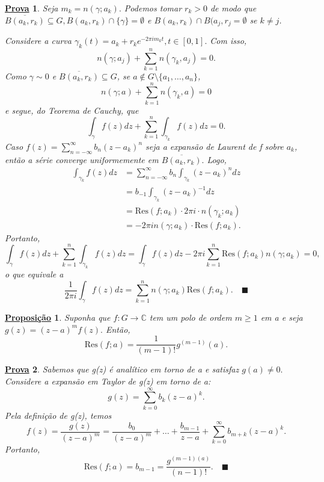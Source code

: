 \documentclass{article}
\newtheorem*{proof*}{\underline{Prova}}
\newtheorem*{prop*}{\underline{Proposi\c c\~ao}}
\renewcommand\qedsymbol{$\blacksquare$}
\begin{document}
 \begin{proof*}
   Seja \(m_{k} = n(\gamma ; a_{k}).\) Podemos tomar \(r_{k}>0\) de modo que \(\overline{B(a_{k}, r_{k})}\subseteq G, B(a_{k}, r_{k})\cap\{\gamma \}=\emptyset \) e 
 \(B(a_{k}, r_{k})\cap B(a_{j}, r_{j} = \emptyset \) se \(k\neq j\).

  Considere a curva \(\gamma_{k}(t) = a_{k} + r_{k}e^{-2\pi i m_{k}t},t\in[0, 1].\) Com isso,
  \[
    n(\gamma ; a_{j}) + \sum\limits_{k=1}^{n}n(\gamma_{k}, a_{j}) = 0.
  \]
  Como \(\gamma \sim 0\) e \(\overline{B(a_{k}, r_{k})}\subseteq G\), se \(a\not\in G\setminus{\{a_{1},\dotsc ,a_{n}\}}\),
    \[
      n(\gamma ; a) + \sum\limits_{k=1}^{n}n(\gamma_{k}, a) = 0
    \]
  e segue, do Teorema de Cauchy, que 
    \[
      \int_{\gamma }^{}f(z)dz + \sum\limits_{k=1}^{n}\int_{\gamma_{k}}^{}f(z)dz = 0.
    \]
  Caso \(f(z) = \sum\limits_{n=-\infty}^{\infty}b_{n}(z-a_{k})^{n}\) seja a expansão de Laurent de f sobre \(a_{k}\), então a série converge uniformemente
 em \(\overline{B(a_{k}, r_{k})}.\) Logo,
\begin{align*}
  \int_{\gamma_{k}}^{}f(z)dz &= \sum\limits_{n=-\infty}^{\infty}b_{n}\int_{\gamma_{k}}^{}(z-a_{k})^{n}dz\\
                             &= b_{-1}\int_{\gamma_{k}}^{}(z-a_{k})^{-1}dz\\
                             &= \mathrm{Res}(f; a_{k})\cdot 2\pi i \cdot n(\gamma_{k}; a_{k})\\
                             &= -2\pi i n(\gamma ; a_{k})\cdot \mathrm{Res}(f; a_{k}).
\end{align*}
  Portanto, 
  \[
    \int_{\gamma }^{}f(z)dz + \sum\limits_{k=1}^{n}\int_{\gamma_{k}}^{}f(z)dz = \int_{\gamma }^{}f(z)dz - 2\pi i \sum\limits_{k=1}^{n}\mathrm{Res}(f; a_{k})n(\gamma ; a_{k}) = 0,
  \]
  o que equivale a 
  \[
    \frac{1}{2\pi i}\int_{\gamma }^{}f(z)dz = \sum\limits_{k=1}^{n}n(\gamma ; a_{k})\mathrm{Res}(f; a_{k}).\quad \text{\qedsymbol}
  \]
 \end{proof*}
 \begin{prop*}
  Suponha que \(f:G\rightarrow \mathbb{C}\) tem um polo de ordem \(m \geq 1\) em a e seja \(g(z) = (z-a)^{m}f(z).\) Então,
    \[
      \mathrm{Res}(f; a) = \frac{1}{(m-1)!}g^{(m-1)}(a).
    \]
 \end{prop*}
 \begin{proof*}
  Sabemos que g(z) é analítico em torno de a e satisfaz \(g(a)\neq 0.\) Considere a expansão em Taylor de g(z) em torno de a:
    \[
      g(z) = \sum\limits_{k=0}^{\infty}b_{k}(z-a)^{k}.
    \]
  Pela definição de g(z), temos 
    \[
      f(z) = \frac{g(z)}{(z-a)^{m}} = \frac{b_{0}}{(z-a)^{m}} + \dotsc + \frac{b_{m-1}}{z-a} + \sum\limits_{k=0}^{\infty}b_{m+k}(z-a)^{k}. 
    \]
  Portanto,
    \[
      \mathrm{Res}(f; a) = b_{m-1} = \frac{g^{(m-1)(a)}}{(n-1)!}.\quad \text{\qedsymbol}
    \]
 \end{proof*}
\end{document}
